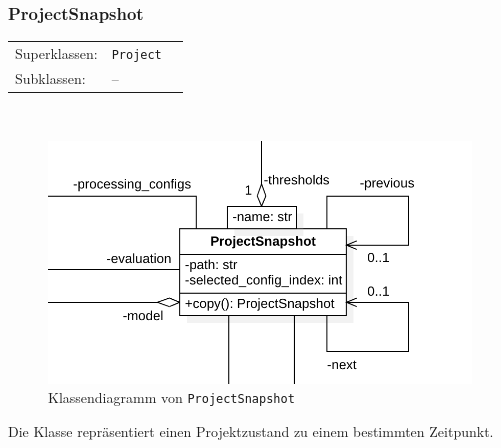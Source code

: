 \documentclass{article}
\begin{document}
\newpage
\subsubsection*{\large{\textbf{ProjectSnapshot}\label{cls:ProjectSnapshot}}}\normalsize
\begin{tabular}{lll}
 Superklassen: & \texttt{Project}\\
 Subklassen: & --
\end{tabular}\\
\begin{figure}[H]%
    \centering
    \includegraphics[width=13cm]{entwurf/Entwurf_dokument/img/cls/model/ProjectSnapshot.png}
    \caption{Klassendiagramm von \texttt{ProjectSnapshot}}
\end{figure}

Die Klasse repräsentiert einen Projektzustand zu einem bestimmten Zeitpunkt.
\\\\
\end{document}
